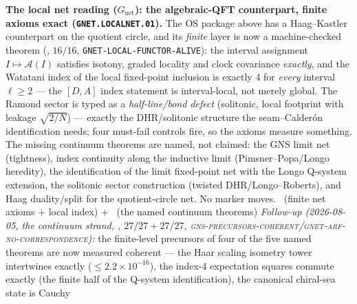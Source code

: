 \begin{center}
\end{center}

\noindent\textbf{The local net reading ($G_{\mathrm{net}}$): the
algebraic-QFT counterpart, finite axioms exact
(\texttt{GNET.LOCALNET.01}).}  The OS package above has a
Haag--Kastler counterpart on the quotient circle, and its
\emph{finite} layer is now a machine-checked theorem
(, $16/16$,
\texttt{GNET-LOCAL-FUNCTOR-ALIVE}): the interval assignment
$I\mapsto\mathcal A(I)$ satisfies isotony, graded locality and
clock covariance \emph{exactly}, and the Watatani index of the
local fixed-point inclusion is exactly $4$ for \emph{every}
interval $\ell\ge2$ --- the $[D,A]$ index statement is
interval-local, not merely global.  The Ramond sector is typed as a
\emph{half-line/bond defect} (solitonic, local footprint with
leakage $\sqrt{2/N}$) --- exactly the DHR/solitonic structure the
seam--Calder\'on identification needs; four must-fail controls fire,
so the axioms measure something.  The missing continuum theorems
are named, not claimed: the GNS limit net (tightness), index
continuity along the inductive limit (Pimsner--Popa/Longo
heredity), the identification of the limit fixed-point net with the
Longo Q-system extension, the solitonic sector construction
(twisted DHR/Longo--Roberts), and Haag duality/split for the
quotient-circle net.  No marker moves. \mE\ (finite net axioms $+$
local index) $+$ \mC\ (the named continuum theorems)
\emph{Follow-up (2026-08-05, the continuum strand,
, $27/27+27/27$,
\textsc{gns-precursors-coherent}/\textsc{gnet-arf-no-correspondence}):}
the finite-level precursors of four of the five named theorems are
now measured coherent --- the Haar scaling isometry tower
intertwines exactly ($\le2.2\times10^{-16}$), the index-4
expectation squares commute exactly (the finite half of the
Q-system identification), the canonical chiral-sea state is Cauchy
